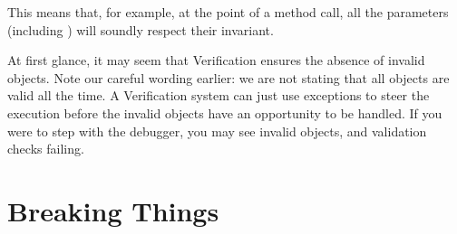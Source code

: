 

\noindent This means that, for example, at the point of a method call,
all the parameters (including \Q@this@) will soundly respect their invariant.

\noindent At first glance, it may seem that Verification ensures the absence of invalid objects.
Note our careful wording earlier: we are not stating that all objects are valid all the time.
A Verification system can just use exceptions to
steer the execution before the invalid objects have an opportunity to be handled.
If you were to step with the debugger, you may see invalid objects, and
validation checks failing.


 


 

\section{Breaking Things}
\label{s:example}
\saveSpace

